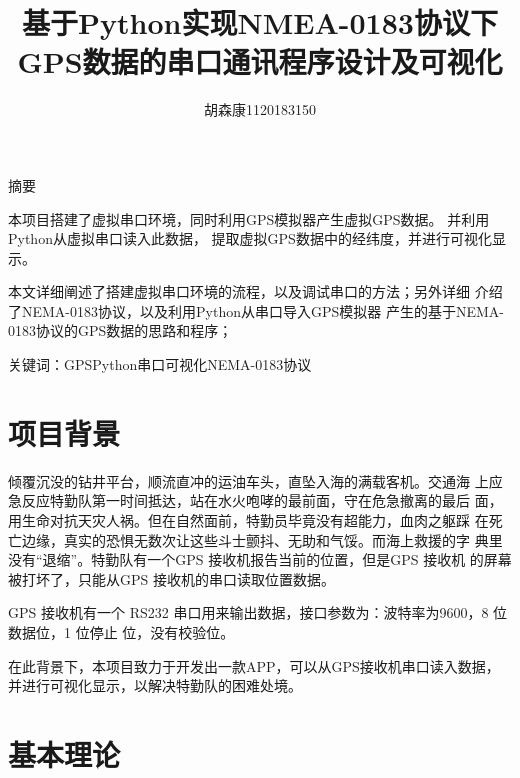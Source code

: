 \documentclass[UTF-8, a4paper, 12pt]{ctexart}
\title{\bfseries \Huge 基于Python实现NMEA-0183协议下GPS数据的串口通讯程序设计及可视化}
\author{胡森康1120183150}
\date{}
\begin{document}

\maketitle

\bigskip
\bigskip
\begin{center}
    {\large 摘\qquad 要}
\end{center}

本项目搭建了虚拟串口环境，同时利用GPS模拟器产生虚拟GPS数据。
并利用Python从虚拟串口读入此数据，
提取虚拟GPS数据中的经纬度，并进行可视化显示。

本文详细阐述了搭建虚拟串口环境的流程，以及调试串口的方法；另外详细
介绍了NEMA-0183协议，以及利用Python从串口导入GPS模拟器
产生的基于NEMA-0183协议的GPS数据的思路和程序；
\bigskip

关键词：GPS\quad Python\quad 串口\quad 可视化\quad NEMA-0183协议
     

     
\thispagestyle{empty}       %
\newpage                    %
\tableofcontents\thispagestyle{empty}
\newpage
\setcounter{page}{1}        %



\section{项目背景}
倾覆沉没的钻井平台，顺流直冲的运油车头，直坠入海的满载客机。交通海
上应急反应特勤队第一时间抵达，站在水火咆哮的最前面，守在危急撤离的最后
面，用生命对抗天灾人祸。但在自然面前，特勤员毕竟没有超能力，血肉之躯踩
在死亡边缘，真实的恐惧无数次让这些斗士颤抖、无助和气馁。而海上救援的字
典里没有“退缩”。特勤队有一个GPS 接收机报告当前的位置，但是GPS 接收机
的屏幕被打坏了，只能从GPS 接收机的串口读取位置数据。

GPS 接收机有一个
RS232 串口用来输出数据，接口参数为：波特率为9600，8 位数据位，1 位停止
位，没有校验位。

在此背景下，本项目致力于开发出一款APP，可以从GPS接收机串口读入数据，
并进行可视化显示，以解决特勤队的困难处境。

\section{基本理论}
\end{document}
